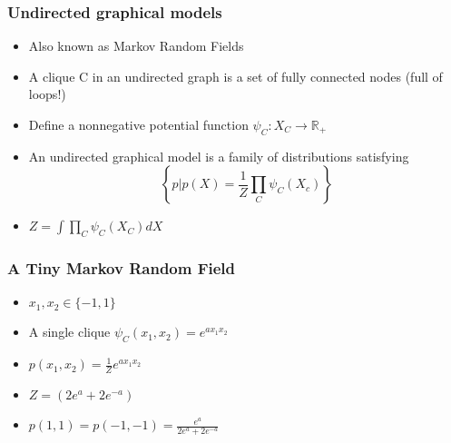 \documentclass[slidestop,compress,mathserif]{beamer}
\begin{document}
	\begin{frame}
		\frametitle{Undirected graphical models}
		\begin{itemize}
			\item Also known as Markov Random Fields
			\item A clique C in an undirected graph is a set of fully connected nodes (full of loops!)
			\item Define a nonnegative potential function $\psi_C:X_C\rightarrow \mathbb{R_+}$
			\item An undirected graphical model is a family of distributions satisfying
			$$\left\{p|p(X)=\frac{1}{Z}\prod_C\psi_C(X_c)\right\}$$
			\item $Z=\int\prod_C\psi_C(X_C)dX$
		\end{itemize}
	\end{frame}
	\begin{frame}
		\frametitle{A Tiny Markov Random Field}
		\begin{figure}
			
			
		\end{figure}
		\begin{itemize}
			\item $x_1,x_2\in \{-1,1\}$
			\item A single clique $\psi_C(x_1,x_2)=e^{ax_1x_2}$
			\item $p(x_1,x_2) = \frac{1}{Z}e^{ax_1x_2}$
			\item $Z=(2e^a+2e^{-a})$
			\item $p(1,1)=p(-1,-1)=\frac{e^a}{2e^a+2e^{-a}}$
		\end{itemize}
	\end{frame}
\end{document}
